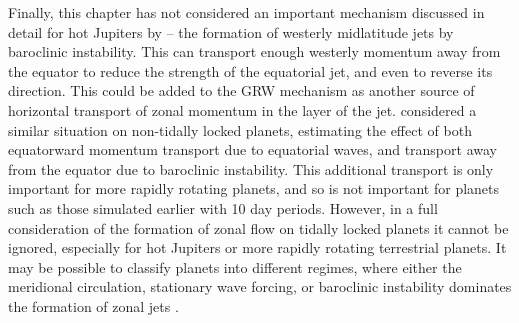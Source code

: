 Finally, this chapter has not considered an important mechanism discussed in detail for hot Jupiters by \citet{showman2015circulation} -- the formation of westerly midlatitude jets by baroclinic instability. This can transport enough westerly momentum away from the equator to reduce the strength of the equatorial jet, and even to reverse its direction. This could be added to the GRW mechanism as another source of horizontal transport of zonal momentum in the layer of the jet. \citet{laraia2015superrotation} considered a similar situation on non-tidally locked planets, estimating the effect of both equatorward momentum transport due to equatorial waves, and transport away from the equator due to baroclinic instability. This additional transport is only important for more rapidly rotating planets, and so is not important for planets such as those simulated earlier with 10 day periods. However, in a full consideration of the formation of zonal flow on tidally locked planets it cannot be ignored, especially for hot Jupiters or more rapidly rotating terrestrial planets. It may be possible to classify planets into different regimes, where either the meridional circulation, stationary wave forcing, or baroclinic instability dominates the formation of zonal jets \citep{showman2015circulation}.

